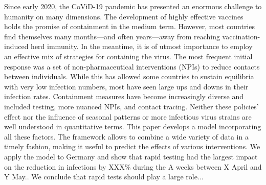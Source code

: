 



Since early 2020, the CoViD-19 pandemic has presented an enormous challenge to humanity on many dimensions. The development of highly effective vaccines holds the promise of containment in the medium term. However, most countries find themselves many months---and often years---away from reaching vaccination-induced herd immunity. In the meantime, it is of utmost importance to employ an effective mix of strategies for containing the virus. The most frequent initial response was a set of non-pharmaceutical interventions (NPIs) to reduce contacts between individuals. While this has allowed some countries to sustain equilibria with very low infection numbers, most have seen large ups and downs in their infection rates. Containment measures have become increasingly diverse and included testing, more nuanced NPIs, and contact tracing. Neither these policies' effect nor the influence of seasonal patterns or more infectious virus strains are well understood in quantitative terms. This paper develops a model incorporating all these factors. The framework allows to combine a wide variety of data in a timely fashion, making it useful to predict the effects of various interventions. We apply the model to Germany and show that rapid testing had the largest impact on the reduction in infections by XXX\% during the A weeks between X April and Y May.. We conclude that rapid tests should play a large role...

